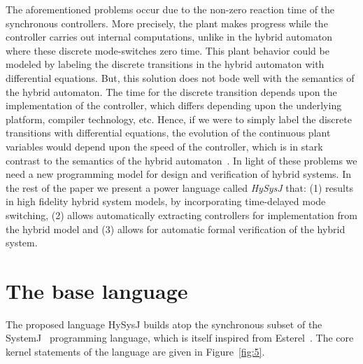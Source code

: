 \documentclass[10pt,journal,cspaper,compsoc]{IEEEtran}
\begin{document}
The aforementioned problems occur due to the non-zero reaction time of
the synchronous controllers. More precisely, the plant makes progress
while the controller carries out internal computations, unlike in the
hybrid automaton where these discrete mode-switches zero time. This
plant behavior could be modeled by labeling the discrete transitions in
the hybrid automaton with differential equations. But, this solution
does not bode well with the semantics of the hybrid automaton. The time
for the discrete transition depends upon the implementation of the
controller, which differs depending upon the underlying platform,
compiler technology, etc. Hence, if we were to simply label the discrete
transitions with differential equations, the evolution of the continuous
plant variables would depend upon the speed of the controller, which is
in stark contrast to the semantics of the hybrid
automaton~\cite{Henzinger:1996:THA:788018.788803}. In light of these
problems we need a new programming model for design and verification of
hybrid systems. In the rest of the paper we present a power language
called \textit{HySysJ} that: (1) results in high fidelity hybrid system
models, by incorporating time-delayed mode switching, (2) allows
automatically extracting controllers for implementation from the hybrid
model and (3) allows for automatic formal verification of the hybrid
system.





\section{The base language}
\label{sec:base-language}

The proposed language HySysJ builds atop the synchronous subset of the
SystemJ~\cite{amal10} programming language, which is itself inspired
from Esterel~\cite{berry96}. The core kernel statements of the language
are given in Figure~\ref{fig:5}.
\end{document}
